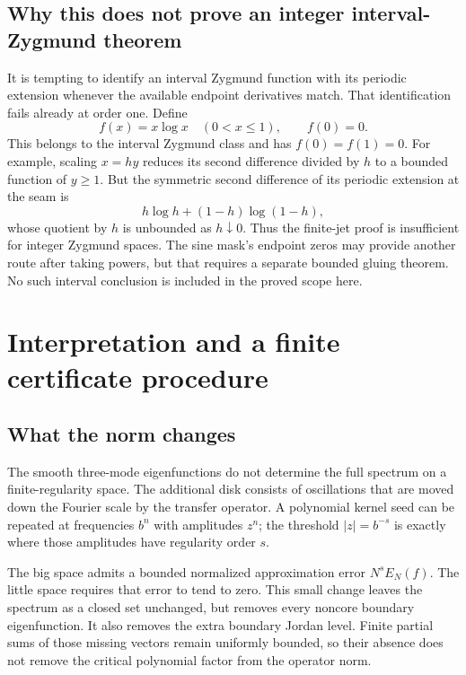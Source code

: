 \documentclass[11pt,a4paper]{article}
\numberwithin{equation}{section}
\theoremstyle{definition}
\theoremstyle{remark}
\begin{document}
\subsection{Why this does not prove an integer interval-Zygmund theorem}
It is tempting to identify an interval Zygmund function with its
periodic extension whenever the available endpoint derivatives match.
That identification fails already at order one. Define
\begin{equation}
 f(x)=x\log x\quad(0<x\le1),\qquad f(0)=0.
 \label{eq:seam-example}
\end{equation}
This belongs to the interval Zygmund class and has $f(0)=f(1)=0$.
For example, scaling $x=hy$ reduces its second difference divided by
$h$ to a bounded function of $y\ge1$. But the symmetric second
difference of its periodic extension at the seam is
\[
 h\log h+(1-h)\log(1-h),
\]
whose quotient by $h$ is unbounded as $h\downarrow0$.
Thus the finite-jet proof is insufficient for integer Zygmund spaces.
The sine mask's endpoint zeros may provide another route after taking
powers, but that requires a separate bounded gluing theorem. No such
interval conclusion is included in the proved scope here.

\section{Interpretation and a finite certificate procedure}
\label{sec:interpretation}

\subsection{What the norm changes}
The smooth three-mode eigenfunctions do not determine the full spectrum
on a finite-regularity space. The additional disk consists of oscillations
that are moved down the Fourier scale by the transfer operator. A
polynomial kernel seed can be repeated at frequencies $b^n$ with
amplitudes $z^n$; the threshold $|z|=b^{-s}$ is exactly where those
amplitudes have regularity order $s$.

The big space admits a bounded normalized approximation error
$N^sE_N(f)$. The little space requires that error to tend to zero.
This small change leaves the spectrum as a closed set unchanged, but
removes every noncore boundary eigenfunction. It also removes the
extra boundary Jordan level. Finite partial sums of those missing
vectors remain uniformly bounded, so their absence does not remove
the critical polynomial factor from the operator norm.
\end{document}
